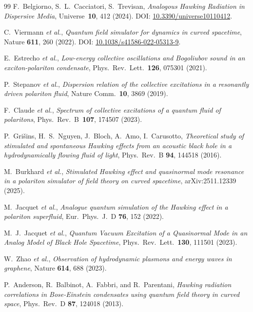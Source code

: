 \documentclass[aps,prd,reprint,nofootinbib,superscriptaddress]{revtex4-2}
\begin{document}
\begin{thebibliography}{99}
F.~Belgiorno, S.~L.~Cacciatori, S.~Trevisan,
\emph{Analogous Hawking Radiation in Dispersive Media},
Universe~\textbf{10}, 412 (2024). DOI: \href{https://doi.org/10.3390/universe10110412}{10.3390/universe10110412}.

C.~Viermann \emph{et al.},
\emph{Quantum field simulator for dynamics in curved spacetime},
Nature \textbf{611}, 260 (2022). DOI: \href{https://doi.org/10.1038/s41586-022-05313-9}{10.1038/s41586-022-05313-9}.

E.~Estrecho \emph{et al.},
\emph{Low-energy collective oscillations and Bogoliubov sound
in an exciton-polariton condensate},
Phys.~Rev.~Lett.~\textbf{126}, 075301 (2021).

P.~Stepanov \emph{et al.},
\emph{Dispersion relation of the collective excitations in a
resonantly driven polariton fluid},
Nature Comm.~\textbf{10}, 3869 (2019).

F.~Claude \emph{et al.},
\emph{Spectrum of collective excitations of a quantum fluid of polaritons},
Phys.~Rev.~B~\textbf{107}, 174507 (2023).

P.~Gri\v{s}ins, H.~S.~Nguyen, J.~Bloch, A.~Amo, I.~Carusotto,
\emph{Theoretical study of stimulated and spontaneous Hawking
effects from an acoustic black hole in a hydrodynamically flowing
fluid of light},
Phys.~Rev.~B \textbf{94}, 144518 (2016).

M.~Burkhard \emph{et al.},
\emph{Stimulated Hawking effect and quasinormal mode resonance in a
polariton simulator of field theory on curved spacetime},
arXiv:2511.12339 (2025).

M.~Jacquet \emph{et al.},
\emph{Analogue quantum simulation of the Hawking effect in a
polariton superfluid},
Eur.~Phys.~J.~D \textbf{76}, 152 (2022).

M.~J.~Jacquet \emph{et al.},
\emph{Quantum Vacuum Excitation of a Quasinormal Mode in an
Analog Model of Black Hole Spacetime},
Phys.~Rev.~Lett.~\textbf{130}, 111501 (2023).

W.~Zhao \emph{et al.},
\emph{Observation of hydrodynamic plasmons and energy waves in
graphene},
Nature \textbf{614}, 688 (2023).

P.~Anderson, R.~Balbinot, A.~Fabbri, and R.~Parentani,
\emph{Hawking radiation correlations in Bose-Einstein condensates
using quantum field theory in curved space},
Phys.~Rev.~D \textbf{87}, 124018 (2013).


\end{thebibliography}
\end{document}
